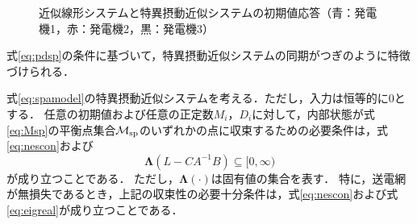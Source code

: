 \documentclass[a4j,10pt,oneside,openany,dvipdfmx]{jsbook}
\begin{document}
\begin{figure}[t]
{\begin{minipage}{0.32\linewidth}
  \end{minipage}
  \caption{近似線形システムと特異摂動近似システムの初期値応答（青：発電機1，赤：発電機2，黒：発電機3）}
  \label{fig:timeexsp}
  }
\end{figure}

式\eqref{eq:pdsp}の条件に基づいて，特異摂動近似システムの同期がつぎのように特徴づけられる．

\begin{theorem}\label{thm:2ndsys}
式\eqref{eq:spamodel}の特異摂動近似システムを考える．ただし，入力は恒等的に0とする．
任意の初期値および任意の正定数$M_i$，$D_i$に対して，内部状態が式\eqref{eq:Msp}の平衡点集合$\mathcal{M}_{\rm sp}$のいずれかの点に収束するための必要条件は，式\eqref{eq:nescon}および
\begin{equation}\label{eq:eigreal}
\bm{\Lambda}(L-CA^{-1}B)\subseteq [0,\infty)
\end{equation}
が成り立つことである．
ただし，$\bm{\Lambda}(\cdot)$は固有値の集合を表す．
特に，送電網が無損失であるとき，上記の収束性の必要十分条件は，式\eqref{eq:nescon}および式\eqref{eq:eigreal}が成り立つことである．
\end{theorem}
\end{document}
